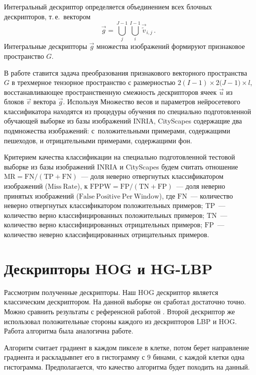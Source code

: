 \documentclass[12pt,twoside]{article}
\begin{document}
Интегральный дескриптор определяется объединением всех
блочных дескрипторов, т.\,е.\ вектором
\begin{equation}
\vec {g}=\bigcup_j^{J-1}{\bigcup_i^{I-1}{\vec{\tilde{v}}_{i,j}}}\,.
\end{equation}
Интегральные дескрипторы $\vec{g}$ множества изображений формируют
признаковое пространство $G$. 

В работе ставится задача преобразования признакового векторного пространства $G$ в трехмерное тензорное пространство с размерностью ${2(I-1)}\times{2(J-1})\times{l}$, восстанавливающее пространственную смежность дескрипторов ячеек $\vec{u}$ из блоков $\vec{v}$ вектора $\vec{g}$. Используя
Множество весов и параметров нейросетевого классификатора находятся из процедуры обучения по специально подготовленной 
обучающей выборке из базы изображений INRIA, CityScapes \cite{inria} содержащие два подмножества изображений: 
с~положительными примерами, содержащими пешеходов, и отрицательными примерами, содержащими фон.

	Критерием качества классификации  на специально
	подготовленной тестовой выборке из базы изображений INRIA \cite{inria} и CityScapes
	будем считать отношение $\mathrm{MR} = \mathrm{FN}/(\mathrm{TP}+\mathrm{FN})$~---
	доля неверно отвергнутых классификатором изображений ($\mathrm{Miss\ Rate}$),
	к $\mathrm{FPPW} = \mathrm{FP}/(\mathrm{TN}+\mathrm{FP})$~---
	доля неверно принятых изображений ($\mathrm{False\ Positive\ Per\
	Window}$), где $\mathrm{FN}$~--- количество неверно отвергнутых
	классификатором положительных примеров; $\mathrm{TP}$~---
	количество верно классифицированных положительных примеров;
	$\mathrm{TN}$~--- количество верно классифицированных отрицательных
	примеров; $\mathrm{FP}$~--- количество неверно классифицированных отрицательных примеров.


\section{Дескрипторы HOG и HG-LBP}
Рассмотрим полученные дескрипторы. Наш HOG дескриптор является классическим дескриптором. На данной выборке он сработал достаточно точно. Можно сравнить результаты с референсной работой \cite{Wang09}.
Второй дескриптор же использовал положительные стороны каждого из дескрипторов LBP и HOG. Работа алгоритма была аналогична работе\cite{Wang09}. 

Алгоритм считает градиент в каждом пикселе в клетке, потом берет направление градиента и раскладывпет его в гистограмму с 9 бинами, с каждой клетки одна гистограмма. Предполагается, что качество алгоритма будет походить на данный.
\end{document}
